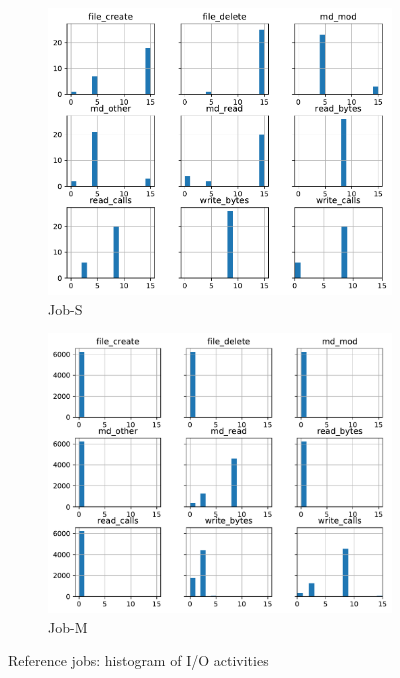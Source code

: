 \documentclass{jhps}
\begin{document}
\begin{figure}
\begin{subfigure}{0.49\textwidth} %
\centering
\includegraphics[width=\textwidth]{job-ks-0hist4296426}
\caption{Job-S}\label{fig:job-S-hist}
\end{subfigure}
\centering
\begin{subfigure}{0.49\textwidth}
\centering
\includegraphics[width=\textwidth]{job-ks-1hist5024292}
\caption{Job-M}\label{fig:job-M-hist}
\end{subfigure}
\centering


\caption{Reference jobs: histogram of I/O activities}%
\label{fig:refJobsHist}
\end{figure}
\end{document}
